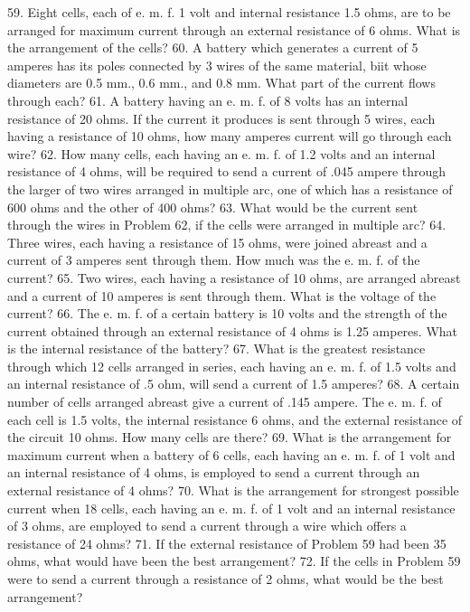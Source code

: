 59. Eight cells, each of e. m. f. 1 volt and internal resistance 1.5 ohms, are to be arranged for maximum current through an external resistance of 6 ohms. What is the arrangement of the cells?
60. A battery which generates a current of 5 amperes has its poles connected by 3 wires of the same material, biit whose diameters are 0.5 mm., 0.6 mm., and 0.8 mm. What part of the current flows through each?
61. A battery having an e. m. f. of 8 volts has an internal resistance of 20 ohms. If the current it produces is sent through 5 wires, each having a resistance of 10 ohms, how many amperes current will go through each wire?
62. How many cells, each having an e. m. f. of 1.2 volts and an internal resistance of 4 ohms, will be required to send a current of .045 ampere through the larger of two wires arranged in multiple arc, one of which has a resistance of 600 ohms and the other of 400 ohms?
63. What would be the current sent through the wires in Problem 62, if the cells were arranged in multiple arc?
64. Three wires, each having a resistance of 15 ohms, were joined abreast and a current of 3 amperes sent through them. How much was the e. m. f. of the current?
65. Two wires, each having a resistance of 10 ohms, are arranged abreast and a current of 10 amperes is sent through them. What is the voltage of the current?
66. The e. m. f. of a certain battery is 10 volts and the strength of the current obtained through an external resistance of 4 ohms is 1.25 amperes. What is the internal resistance of the battery?
67. What is the greatest resistance through which 12 cells arranged in series, each having an e. m. f. of 1.5 volts and an internal resistance of .5 ohm, will send a current of 1.5 amperes?
68. A certain number of cells arranged abreast give a current of .145 ampere. The e. m. f. of each cell is 1.5 volts, the internal resistance 6 ohms, and the external resistance of the circuit 10 ohms. How many cells are there?
69. What is the arrangement for maximum current when a battery of 6 cells, each having an e. m. f. of 1 volt and an internal resistance of 4 ohms, is employed to send a current through an external resistance of 4 ohms?
70. What is the arrangement for strongest possible current when 18 cells, each having an e. m. f. of 1 volt and an internal resistance of 3 ohms, are employed to send a current through a wire which offers a resistance of 24 ohms?
71. If the external resistance of Problem 59 had been 35 ohms, what would have been the best arrangement?
72. If the cells in Problem 59 were to send a current through a resistance of 2 ohms, what would be the best arrangement?

